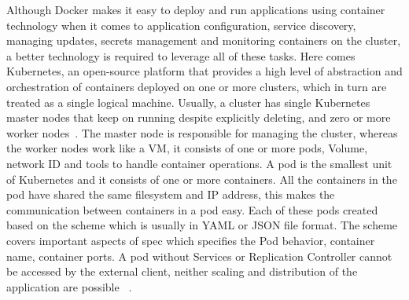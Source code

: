 Although Docker makes it easy to deploy and run applications using
container technology when it comes to application configuration,
service discovery, managing updates, secrets management and monitoring
containers on the cluster, a better technology is required to leverage
all of these tasks. Here comes Kubernetes, an open-source platform
that provides a high level of abstraction and orchestration of
containers deployed on one or more clusters, which in turn are treated
as a single logical machine. Usually, a cluster has single Kubernetes
master nodes that keep on running despite explicitly deleting, and
zero or more worker nodes~\cite{hid-sp18-602-kubernetes}. The master
node is responsible for managing the cluster, whereas the worker nodes
work like a VM, it consists of one or more pods, Volume, network ID
and tools to handle container operations. A pod is the smallest unit
of Kubernetes and it consists of one or more containers. All the
containers in the pod have shared the same filesystem and IP address,
this makes the communication between containers in a pod easy. Each of
these pods created based on the scheme which is usually in YAML or
JSON file format. The scheme covers important aspects of spec which
specifies the Pod behavior, container name, container ports. A pod
without Services or Replication Controller cannot be accessed by the
external client, neither scaling and distribution of the application
are possible ~\cite{hid-sp18-602-pods}.

